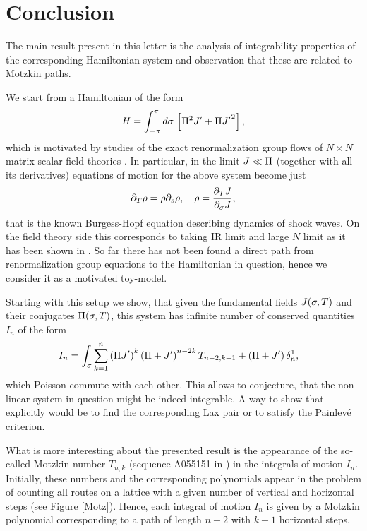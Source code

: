 \documentclass[12pt]{article}%
\numberwithin{equation}{section}
\begin{document}
\section{Conclusion}

The main result present in this letter is the analysis of integrability properties of the corresponding Hamiltonian system and observation that these are related to Motzkin paths.

We start from a Hamiltonian of the form
\begin{equation}
H=\int_{-\pi}^{\pi}d\s  \, \left[\P^2J'+\P{J'}^2\right],
\end{equation}
which is motivated by studies of the exact renormalization group flows of $N\times N$ matrix scalar field theories \cite{Akhmedov:2010mz}. In particular, in the limit $J \ll \P$ (together with all its derivatives) equations of motion for the above system become just
\begin{equation}
\dt_T\r= \r \dt_s \r, \quad \r= \fr{\dt_T{J}}{\dt_\s J},
\end{equation}
that is the known Burgess-Hopf equation describing dynamics of shock waves. On the field theory side this corresponds to taking IR limit and large $N$ limit as it has been shown in \cite{Akhmedov:2010mz}. So far there has not been found a direct path from renormalization group equations to the Hamiltonian in question, hence we consider it as a motivated toy-model.

Starting with this setup we show, that given the fundamental fields $J(\s,T)$  and their conjugates $\P(\s,T)$, this system has infinite number of conserved quantities $I_n$  of the form
\begin{equation}
\begin{aligned}
I_n&=\int_\s\sum_{k=1}^n\left(\P J'\right)^{k}\left(\P+J'\right)^{n-2k}T_{n-2,k-1}+\left(\P+J'\right) \d_{n}^1,
\end{aligned}
\end{equation}
which Poisson-commute with each other. This allows to conjecture, that the non-linear system in question might be indeed integrable. A way to show that explicitly would be to find the corresponding Lax pair or to satisfy the Painlev\'e criterion. 

What is more interesting about the presented result is the appearance of the so-called Motzkin number $T_{n,k}$ (sequence A055151 in \cite{Sloane}) in the integrals of motion $I_n$. Initially, these numbers and the corresponding polynomials appear in the problem of counting all routes on a lattice with a given number of vertical and horizontal steps (see Figure \ref{Motz}). Hence, each integral of motion $I_n$ is given by a Motzkin polynomial corresponding to a path of length $n-2$ with $k-1$ horizontal steps. 
\end{document}
